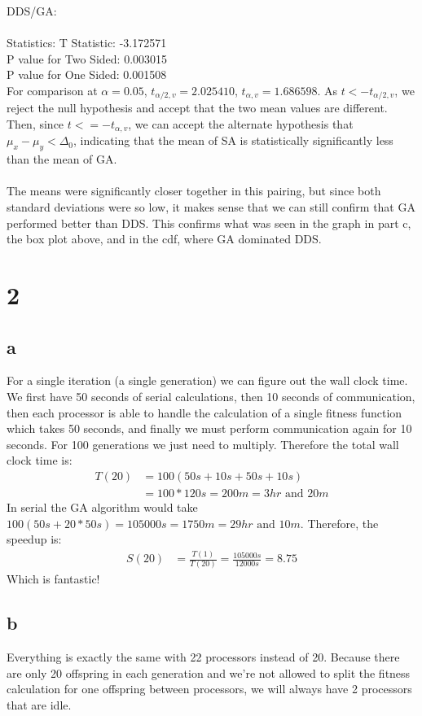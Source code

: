 \documentclass[12pt]{article}
\begin{document}
DDS/GA:\\\\
Statistics: T Statistic: -3.172571\\
P value for Two Sided: 0.003015\\
P value for One Sided: 0.001508\\

For comparison at $\alpha = 0.05$, $t_{\alpha/2,v} = 2.025410$, $t_{\alpha, v}  = 1.686598$. As $t < -t_{\alpha/2,v}$, we reject the null hypothesis and accept that the two mean values are different. Then, since $t <= -t_{\alpha, v}$, we can accept the alternate hypothesis that $\mu_x - \mu_y < \Delta_0$, indicating that the mean of SA is statistically significantly less than the mean of GA.\\\\
The means were significantly closer together in this pairing, but since both standard deviations were so low, it makes sense that we can still confirm that GA performed better than DDS. This confirms what was seen in the graph in part c, the box plot above, and in the cdf, where GA dominated DDS.

\section{2}
\subsection{a}
For a single iteration (a single generation) we can figure out the wall clock time.  We first have 50 seconds of serial calculations, then 10 seconds of communication, then each processor is able to handle the calculation of a single fitness function which takes 50 seconds, and finally we must perform communication again for 10 seconds.  For 100 generations we just need to multiply.  Therefore the total wall clock time is:
\begin{align*}
T(20) & = 100(50s + 10s + 50s + 10s)\\
& = 100 * 120s = 200m = 3hr \text{ and } 20m
\end{align*}
In serial the GA algorithm would take $100(50s + 20*50s)= 105000s = 1750m = 29 hr \text{ and } 10m$.  Therefore, the speedup is:
\begin{align*}
S(20) & = \frac{T(1)}{T(20)} = \frac{105000s}{12000s} = 8.75
\end{align*}
Which is fantastic!

\subsection{b}
Everything is exactly the same with 22 processors instead of 20.  Because there are only 20 offspring in each generation and we're not allowed to split the fitness calculation for one offspring between processors, we will always have 2 processors that are idle.
\end{document}
